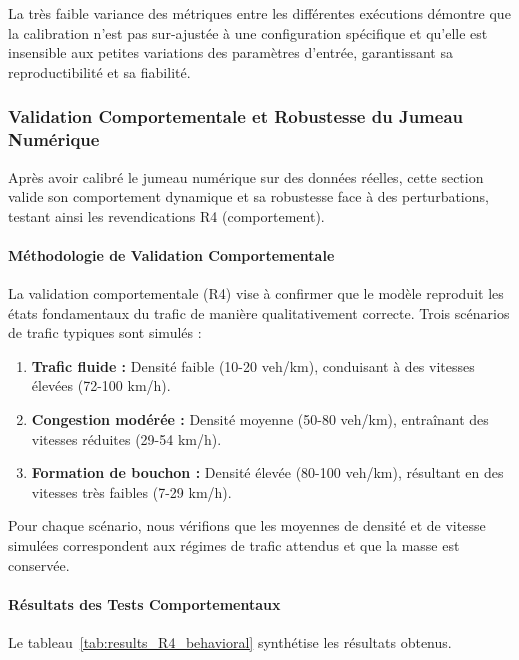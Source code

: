 La très faible variance des métriques entre les différentes exécutions démontre que la
calibration n'est pas sur-ajustée à une configuration spécifique et qu'elle est insensible aux petites variations des paramètres d'entrée,
garantissant sa reproductibilité et sa fiabilité.

\subsubsection{Validation Comportementale et Robustesse du Jumeau Numérique}
\label{subsec:validation_comportementale_robustesse}

Après avoir calibré le jumeau numérique sur des données réelles, cette section valide son comportement dynamique et sa robustesse face à des perturbations, testant ainsi les revendications R4 (comportement).

\paragraph{Méthodologie de Validation Comportementale}

La validation comportementale (R4) vise à confirmer que le modèle reproduit les états fondamentaux du trafic de manière qualitativement correcte. Trois scénarios de trafic typiques sont simulés :
\begin{enumerate}
    \item \textbf{Trafic fluide :} Densité faible (10-20 veh/km), conduisant à des vitesses élevées (72-100 km/h).
    \item \textbf{Congestion modérée :} Densité moyenne (50-80 veh/km), entraînant des vitesses réduites (29-54 km/h).
    \item \textbf{Formation de bouchon :} Densité élevée (80-100 veh/km), résultant en des vitesses très faibles (7-29 km/h).
\end{enumerate}
Pour chaque scénario, nous vérifions que les moyennes de densité et de vitesse simulées correspondent aux régimes de trafic attendus et que la masse est conservée.

\paragraph{Résultats des Tests Comportementaux}

Le tableau~\ref{tab:results_R4_behavioral} synthétise les résultats obtenus.

